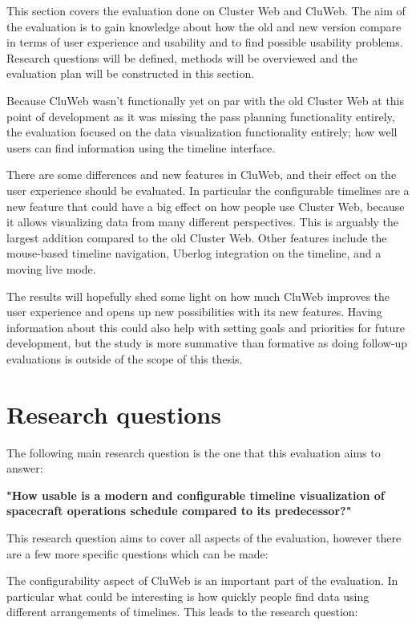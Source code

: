 
This section covers the evaluation done on Cluster Web and CluWeb. The aim of the evaluation is to gain knowledge about how the old and new version compare in terms of user experience and usability and to find possible usability problems. Research questions will be defined, methods will be overviewed and the evaluation plan will be constructed in this section.

Because CluWeb wasn't functionally yet on par with the old Cluster Web at this point of development as it was missing the pass planning functionality entirely, the evaluation focused on the data visualization functionality entirely; how well users can find information using the timeline interface.

There are some differences and new features in CluWeb, and their effect on the user experience should be evaluated. In particular the configurable timelines are a new feature that could have a big effect on how people use Cluster Web, because it allows visualizing data from many different perspectives. This is arguably the largest addition compared to the old Cluster Web. Other features include the mouse-based timeline navigation, Uberlog integration on the timeline, and a moving live mode.

The results will hopefully shed some light on how much CluWeb improves the user experience and opens up new possibilities with its new features. Having information about this could also help with setting goals and priorities for future development, but the study is more summative than formative as doing follow-up evaluations is outside of the scope of this thesis. \cite{albert2013measuring}

\section{Research questions} \label{research_questions}
The following main research question is the one that this evaluation aims to answer:

\textbf{"How usable is a modern and configurable timeline visualization of spacecraft operations schedule compared to its predecessor?"}

This research question aims to cover all aspects of the evaluation, however there are a few more specific questions which can be made:

The configurability aspect of CluWeb is an important part of the evaluation. In particular what could be interesting is how quickly people find data using different arrangements of timelines. This leads to the research question:

